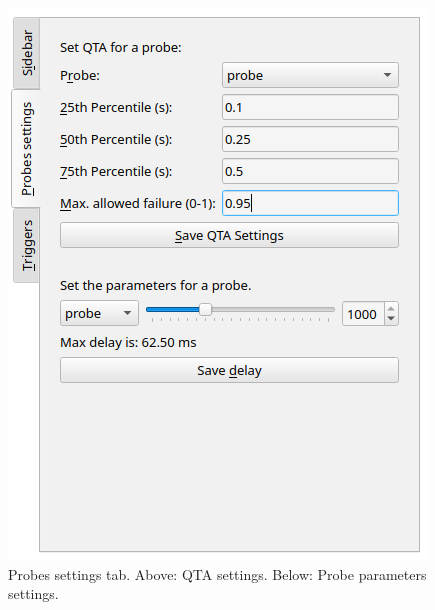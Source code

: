     \begin{figure}[H]
        \begin{center}
            \includegraphics[width = \textwidth]{img/save_qta.png}
        \end{center}
        \caption{Probes settings tab. Above: QTA settings. Below: Probe parameters settings.}
    \end{figure}


